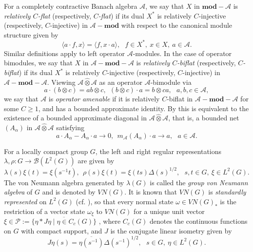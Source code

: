 \documentclass[preprint,12pt]{elsarticle}
\newcommand{\mc}[1]{\mathcal{#1}}
\newcommand{\e}[1]{\emph{#1}}
\newcommand{\la}{\langle}
\newcommand{\ra}{\rangle}
\newcommand{\LG}{VN(G)}
\newcommand{\LT}{L^2(G)}
\newcommand{\BLT}{\mc{B}(L^2(G))}
\newcommand{\lm}{\lambda}
\newcommand{\om}{\omega}
\newcommand{\ten}{\otimes}
\newcommand{\hten}{\widehat{\otimes}}
\providecommand{\norm}[1]{\lVert#1\rVert}
\begin{document}


For a completely contractive Banach algebra $\mc{A}$, we say that $X$ in $\mathbf{mod}-\mc{A}$ is \e{relatively $C$-flat} (respectively, \e{$C$-flat}) if its dual $X^*$ is relatively $C$-injective (respectively, $C$-injective) in $\mc{A}-\mathbf{mod}$ with respect to the canonical module structure given by
$$\la a\cdot f,x\ra = \la f, x\cdot a\ra, \ \ \ f\in X^*, \ x\in X, \ a\in\mc{A}.$$
Similar definitions apply to left operator $\mc{A}$-modules. In the case of operator bimodules, we say that $X$ in $\mc{A}-\mathbf{mod}-\mc{A}$ is \e{relatively $C$-biflat} (respectively, \e{$C$-biflat}) if its dual $X^*$ is relatively $C$-injective (respectively, $C$-injective) in $\mc{A}-\mathbf{mod}-\mc{A}$. Viewing $\mc{A}\hten\mc{A}$ as an operator $\mc{A}$-bimodule via
$$a\cdot(b\ten c)=ab\ten c, \ \ (b\ten c)\cdot a=b\ten ca, \ \ \ a,b,c\in\mc{A},$$
we say that $\mc{A}$ is \e{operator amenable} if it is relatively $C$-biflat in $\mc{A}-\mathbf{mod}-\mc{A}$ for some $C\geq1$, and has a bounded approximate identity. By \cite[Proposition 2.4]{Ru3} this is equivalent to the existence of a bounded approximate diagonal in $\mc{A}\hten\mc{A}$, that is, a bounded net $(A_\alpha)$ in $\mc{A}\hten\mc{A}$ satisfying
$$a\cdot A_\alpha - A_\alpha\cdot a\rightarrow 0, \  \ m_{\mc{A}}(A_\alpha)\cdot a \rightarrow a, \ \ \ a\in\mc{A}.$$


For a locally compact group $G$, the left and right regular representations $\lm,\rho:G\rightarrow\BLT$ are given by
$$\lm(s)\xi(t)=\xi(s^{-1}t), \ \ \rho(s)\xi(t)=\xi(ts)\Delta(s)^{1/2}, \ \ \ s,t\in G, \ \xi\in\LT.$$
The von Neumann algebra generated by $\lm(G)$ is called the \e{group von Neumann algebra} of $G$ and is denoted by $VN(G)$. It is known that $\LG$ is \e{standardly represented} on $\LT$ (cf. \cite{H}), so that every normal state $\om\in \LG_*$ is the restriction of a vector state $\om_\xi$ to $\LG$ for a unique unit vector $\xi\in\mc{P}:=\overline{\{\eta\ast J\eta\mid \eta\in C_c(G)\}}$ \cite[Lemma 2.10]{H}, where $C_c(G)$ denotes the continuous functions on $G$ with compact support, and $J$ is the conjugate linear isometry given by
$$J\eta(s)=\overline{\eta(s^{-1})}\Delta(s^{-1})^{1/2}, \ \ \ s\in G, \ \eta\in\LT.$$
\end{document}
